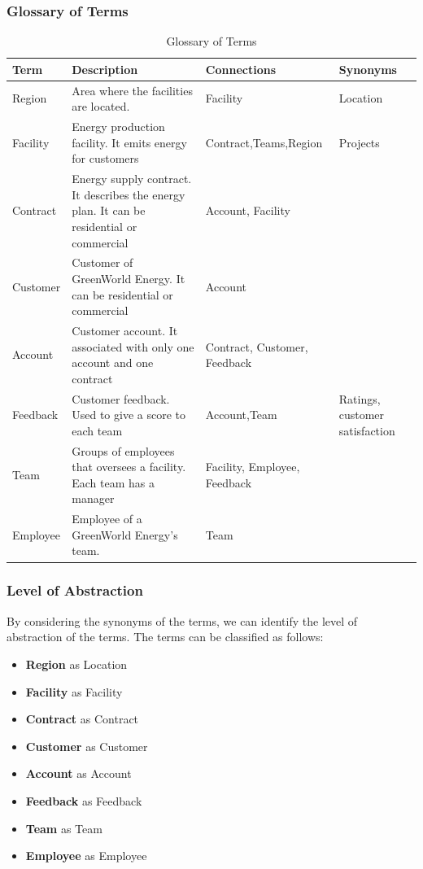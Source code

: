 \subsubsection{Glossary of Terms}
\begin{table}[H]
    \renewcommand{\arraystretch}{1.3} %
    \begin{tabularx}{\textwidth}{|X|X|X|X|}
    \hline
    \textbf{Term}& \textbf{Description}  & \textbf{Connections}    & \textbf{Synonyms}     \\ \hline
    Region      & Area where the facilities are located. & Facility     & Location \\ \hline
    Facility     & Energy production facility. It emits energy for customers      & Contract,Teams,Region         & Projects\\ \hline
    Contract     & Energy supply contract. It describes the energy plan. It can be residential or commercial & Account, Facility     &         \\ \hline
    Customer     & Customer of GreenWorld Energy. It can be residential or commercial       & Account    &        \\ \hline
    Account      & Customer account. It associated with only one account and one contract & Contract, Customer, Feedback     &        \\ \hline
    Feedback     & Customer feedback. Used to give a score to each team       & Account,Team     &         Ratings, customer satisfaction \\\hline
    Team        & Groups of employees that oversees a facility. Each team has a manager       & Facility, Employee, Feedback     &        \\ \hline
    Employee     & Employee of a GreenWorld Energy's team.      & Team     &        \\ \hline
    \end{tabularx}
    \caption{Glossary of Terms}
    \end{table}
\newpage
\subsubsection{Level of Abstraction}
By considering the synonyms of the terms, we can identify the level of abstraction of the terms. The terms can be classified as follows:
\begin{itemize}
    \item \textbf{Region} as Location
    \item \textbf{Facility} as Facility
    \item \textbf{Contract} as Contract
    \item \textbf{Customer} as Customer
    \item \textbf{Account} as Account
    \item \textbf{Feedback} as Feedback
    \item \textbf{Team} as Team
    \item \textbf{Employee} as Employee
\end{itemize}

